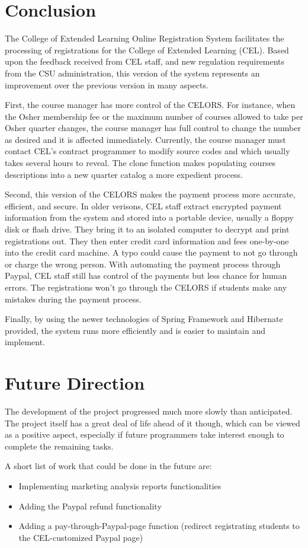 
\section{Conclusion}

The College of Extended Learning Online Registration System facilitates the processing of registrations for the College of Extended Learning (CEL). Based upon the feedback received from CEL staff, and new regulation requirements from the CSU administration, this version of the system represents an improvement over the previous version in many aspects.

First, the course manager has more control of the CELORS. For instance, when the Osher membership fee or the maximum number of courses allowed to take per Osher quarter changes, the course manager has full control to change the number as desired and it is affected immediately. Currently, the course manager must contact CEL's contract programmer to modify source codes and which usually takes several hours to reveal. The clone function makes populating courses descriptions into a new quarter catalog a more expedient process.

Second, this version of the CELORS makes the payment process more accurate, efficient, and secure. In older verisons, CEL staff extract encrypted payment information from the system and stored into a portable device, usually a floppy disk or flash drive. They bring it to an isolated computer to decrypt and print registrations out. They then enter credit card information and fees one-by-one into the credit card machine. A typo could cause the payment to not go through or charge the wrong person. With automating the payment process through Paypal, CEL staff still has control of the payments but less chance for human errors. The registrations won't go through the CELORS if students make any mistakes during the payment process.

Finally, by using the newer technologies of Spring Framework and Hibernate provided, the system runs more efficiently and is easier to maintain and implement.

\section{Future Direction}

The development of the project progressed much more slowly than anticipated. The project itself has a great deal of life ahead of it though, which can be viewed as a positive aspect, especially if future programmers take interest enough to complete the remaining tasks.

A short list of work that could be done in the future are:
\begin{itemize}
    \item{Implementing marketing analysis reports functionalities}
    \item{Adding the Paypal refund functionality}
    \item{Adding a pay-through-Paypal-page function (redirect registrating students to the CEL-customized Paypal page)}
\end{itemize}
